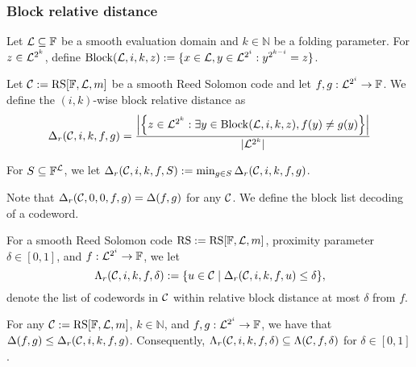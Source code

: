 \subsubsection{Block relative distance}

\begin{definition}
    Let $\mathcal{L} \subseteq \mathbb{F}$ be a smooth evaluation domain and $k \in \mathbb{N}$ be a folding parameter. For $z \in \mathcal{L}^{2^k}$, define $\mathrm{Block}(\mathcal{L}, i, k, z) := \{ x \in \mathcal{L}, y \in \mathcal{L}^{2^i} : y^{2^{k-i}} = z \}$.
\end{definition}

\begin{definition}
    Let $\mathcal{C} := \mathrm{RS}[\mathbb{F}, \mathcal{L}, m]$ be a smooth Reed Solomon code and let $f, g : \mathcal{L}^{2^i} \to \mathbb{F}$. We define the $(i,k)$-wise block relative distance as
    \[
    \Delta_{r}(\mathcal{C}, i, k, f, g) = \frac{ \left| \left\{ z \in \mathcal{L}^{2^k} : \exists y \in \mathrm{Block}(\mathcal{L}, i, k, z), f(y) \neq g(y) \right\} \right| }{ |\mathcal{L}^{2^k}| }
    \]
\end{definition}

\begin{definition}
    For $S \subseteq \mathbb{F}^{\mathcal{L}}$, we let $\Delta_{r}(\mathcal{C}, i, k, f, S) := \min_{g \in S} \Delta_{r}(\mathcal{C}, i, k, f, g)$.
\end{definition}

{Note that $\Delta_{r}(\mathcal{C}, 0, 0, f, g) = \Delta(f, g)$ for any $\mathcal{C}$. We define the block list decoding of a codeword.}

\begin{definition}
    For a smooth Reed Solomon code $\mathrm{RS} := \mathrm{RS}[\mathbb{F}, \mathcal{L}, m]$, proximity parameter $\delta \in [0,1]$, and $f : \mathcal{L}^{2^i} \to \mathbb{F}$, we let
    \[
    \Lambda_{r}(\mathcal{C}, i, k, f, \delta) := \{ u \in \mathcal{C} \mid \Delta_{r}(\mathcal{C}, i, k, f, u) \leq \delta \},
    \]
    denote the list of codewords in $\mathcal{C}$ within relative block distance at most $\delta$ from $f$.
\end{definition}


\begin{lemma}
    For any $\mathcal{C} := \mathrm{RS}[\mathbb{F}, \mathcal{L}, m]$, $k \in \mathbb{N}$, and $f, g : \mathcal{L}^{2^i} \to \mathbb{F}$, we have that $\Delta(f, g) \leq \Delta_{r}(\mathcal{C}, i, k, f, g)$. Consequently, $\Lambda_{r}(\mathcal{C}, i, k, f, \delta) \subseteq \Lambda(\mathcal{C}, f, \delta)$ for $\delta\in[0,1]$.
\end{lemma}

